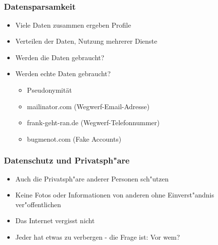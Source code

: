 \documentclass[12pt]{beamer}
\begin{document}
\subsection{}

\begin{frame}
    \frametitle{Datensparsamkeit}
    \begin{itemize}
        \item<2-> Viele Daten zusammen ergeben Profile
	\item<3-> Verteilen der Daten, Nutzung mehrerer Dienste
        \item<4-> Werden die Daten gebraucht?
        \item<5-> Werden echte Daten gebraucht?
            \begin{itemize}
              \item<6-> Pseudonymität
              \item<7-> mailinator.com (Wegwerf-Email-Adresse)
              \item<8-> frank-geht-ran.de (Wegwerf-Telefonnummer)
              \item<9-> bugmenot.com (Fake Accounts)
            \end{itemize}
    \end{itemize}
\end{frame}

\begin{frame}
    \frametitle{Datenschutz und Privatsph"are}
    \begin{itemize}
        \item<2-> Auch die Privatsph"are anderer Personen sch"utzen
	\item<3-> Keine Fotos oder Informationen von anderen ohne Einverst"andnis ver"offentlichen
        \item<4-> Das Internet vergisst nicht
        \item<5-> Jeder hat etwas zu verbergen - die Frage ist: Vor wem?
    \end{itemize}
\end{frame}
\end{document}
